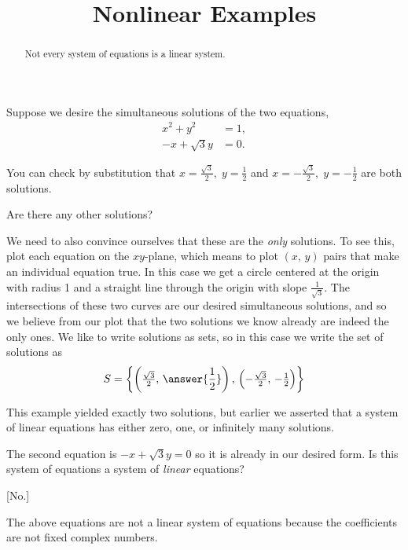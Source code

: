 \documentclass{ximera}
\title{Nonlinear Examples}
\begin{document}
\begin{abstract}
  Not every system of equations is a linear system.
\end{abstract}
\maketitle

\begin{example}
  Suppose we desire the simultaneous solutions of the two equations,
  \begin{align*}
    x^2+y^2&=1,\\
    -x+\sqrt{3}y&=0.
  \end{align*}
  
  You can check by substitution that $x=\tfrac{\sqrt{3}}{2},\;y=\tfrac{1}{2}$ and $x=-\tfrac{\sqrt{3}}{2},\;y=-\tfrac{1}{2}$ are both solutions.

  \begin{question}
    Are there any other solutions?
    \begin{multipleChoice}
    \end{multipleChoice}
  \end{question}
    
  \begin{question}
    We need to also convince ourselves that these are the
    \textit{only} solutions.  To see this, plot each equation on the
    $xy$-plane, which means to plot $(x,\,y)$ pairs that make an
    individual equation true.  In this case we get a circle centered
    at the origin with radius 1 and a straight line through the origin
    with slope $\tfrac{1}{\sqrt{3}}$.  The intersections of these two
    curves are our desired simultaneous solutions, and so we believe
    from our plot that the two solutions we know already are indeed
    the only ones.  We like to write solutions as sets, so in this
    case we write the set of solutions as
    \[
      S=\set{\left(\tfrac{\sqrt{3}}{2},\,\answer{\frac{1}{2}}\right),\,\left(-\tfrac{\sqrt{3}}{2},\,-\tfrac{1}{2}\right)}
    \]
  \end{question}

  \begin{question}
    This example yielded exactly two solutions, but earlier we asserted that a system of linear equations has either zero, one, or infinitely many solutions.

    The second equation is $-x+\sqrt{3}y=0$ so it is already in our desired form.  Is this system of equations a system of \textit{linear} equations?
    \begin{multipleChoice}
      [No.]
    \end{multipleChoice}

    \begin{feedback}
      The above equations are not a linear system of equations because the coefficients are not fixed complex numbers.
    \end{feedback}
  \end{question}
\end{example}
\end{document}

